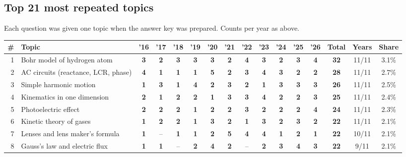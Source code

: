 \documentclass[10pt,a4paper]{article}
\begin{document}
\subsection*{Top 21 most repeated topics}
{\small Each question was given one topic when the answer key was prepared. Counts per year as above.}\par\smallskip
{\footnotesize\setlength{\tabcolsep}{2.6pt}\renewcommand{\arraystretch}{1.2}
\begin{tabularx}{\linewidth}{@{}r>{\raggedright\arraybackslash}X*{11}{c}ccc@{}}\toprule
\# & Topic & '16 & '17 & '18 & '19 & '20 & '21 & '22 & '23 & '24 & '25 & '26 & Total & Years & Share\\\midrule
1 & Bohr model of hydrogen atom & \textbf{3} & \textbf{2} & \textbf{3} & \textbf{3} & \textbf{3} & \textbf{2} & \textbf{4} & \textbf{3} & \textbf{2} & \textbf{3} & \textbf{4} & \textbf{32} & 11/11 & 3.1\%\\
2 & AC circuits (reactance, LCR, phase) & \textbf{4} & \textbf{1} & \textbf{1} & \textbf{1} & \textbf{5} & \textbf{2} & \textbf{3} & \textbf{4} & \textbf{3} & \textbf{2} & \textbf{2} & \textbf{28} & 11/11 & 2.7\%\\
3 & Simple harmonic motion & \textbf{1} & \textbf{3} & \textbf{1} & \textbf{4} & \textbf{2} & \textbf{3} & \textbf{2} & \textbf{1} & \textbf{3} & \textbf{3} & \textbf{3} & \textbf{26} & 11/11 & 2.5\%\\
4 & Kinematics in one dimension & \textbf{2} & \textbf{1} & \textbf{2} & \textbf{2} & \textbf{1} & \textbf{3} & \textbf{3} & \textbf{4} & \textbf{2} & \textbf{2} & \textbf{3} & \textbf{25} & 11/11 & 2.4\%\\
5 & Photoelectric effect & \textbf{2} & \textbf{2} & \textbf{2} & \textbf{1} & \textbf{2} & \textbf{2} & \textbf{3} & \textbf{2} & \textbf{2} & \textbf{2} & \textbf{4} & \textbf{24} & 11/11 & 2.3\%\\
6 & Kinetic theory of gases & \textbf{1} & \textbf{2} & \textbf{2} & \textbf{1} & \textbf{3} & \textbf{2} & \textbf{1} & \textbf{3} & \textbf{2} & \textbf{3} & \textbf{2} & \textbf{22} & 11/11 & 2.1\%\\
7 & Lenses and lens maker's formula & \textbf{1} & {\color{gray!60}--} & \textbf{1} & \textbf{1} & \textbf{2} & \textbf{5} & \textbf{4} & \textbf{4} & \textbf{1} & \textbf{2} & \textbf{1} & \textbf{22} & 10/11 & 2.1\%\\
8 & Gauss's law and electric flux & \textbf{1} & \textbf{1} & {\color{gray!60}--} & \textbf{2} & \textbf{4} & \textbf{2} & {\color{gray!60}--} & \textbf{2} & \textbf{3} & \textbf{4} & \textbf{3} & \textbf{22} & 9/11 & 2.1\%\\

\end{tabularx}}
\end{document}
